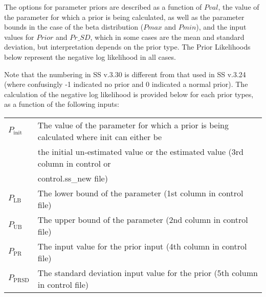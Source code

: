 The options for parameter priors are described as a function of $Pval$, the value of the parameter for which a prior is being calculated, as well as the parameter bounds in the case of the beta distribution ($Pmax$ and $Pmin$), and the input values for $Prior$ and $Pr\_SD$, which in some cases are the mean and standard deviation, but interpretation depends on the prior type. The Prior Likelihoods below represent the negative log likelihood in all cases.

Note that the numbering in SS v.3.30 is different from that used in SS v.3.24 (where confusingly -1 indicated no prior and 0 indicated a normal prior). The calculation of the negative log likelihood is provided below for each prior types, as a function of the following inputs:

\begin{tabular}{ll}
	$P_\text{init}$ & The value of the parameter for which a prior is being calculated where init can either be\\
	                & the initial un-estimated value or the estimated value (3rd column in control or \\
	                & control.ss\_new file)       \\
	$P_\text{LB}$   & The lower bound of the parameter (1st column in control file)     \\
	$P_\text{UB}$   & The upper bound of the parameter (2nd column in control file)     \\
	$P_\text{PR}$   & The input value for the prior input (4th column in control file)  \\
	$P_\text{PRSD}$ & The standard deviation input value for the prior (5th column in control file) \\
\end{tabular}

